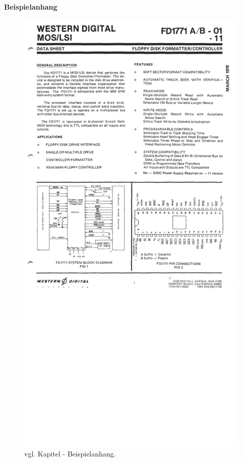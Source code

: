 \label{Anhang}
\vspace*{5mm}

\large{\textbf{Beispielanhang}}
\begin{figure}[H]
    \centering
    \includegraphics[width = \textwidth]{Anhang/Beispielanhang.pdf}
    \caption*{vgl. Kapitel \glqq {}\grqq{} - Beispielanhang.}
    \label{abb:Beispielanhang}
\end{figure}